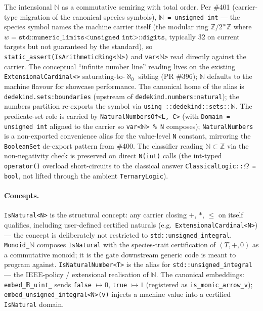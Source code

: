 \documentclass[11pt, a4paper]{report}
\begin{document}
The intensional $\mathbb{N}$ as a commutative semiring with total order. Per \#401 (carrier-type migration of the canonical species symbols), \texttt{$\mathbb{N}$ = unsigned int} --- the species symbol names the machine carrier itself (the modular ring $\mathbb{Z}/2^w\mathbb{Z}$ where $w = \texttt{std::numeric\_limits<unsigned int>::digits}$, typically 32 on current targets but not guaranteed by the standard), so \texttt{static\_assert(IsArithmeticRing<$\mathbb{N}$>)} and \texttt{var<$\mathbb{N}$>} read directly against the carrier. The conceptual ``infinite number line'' reading lives on the existing \texttt{ExtensionalCardinal<>} saturating-to-$\aleph_0$ sibling (PR \#396); $\mathbb{N}$ defaults to the machine flavour for showcase performance. The canonical home of the alias is \texttt{dedekind.sets:boundaries} (upstream of \texttt{dedekind.numbers:natural}); the numbers partition re-exports the symbol via \texttt{using ::dedekind::sets::$\mathbb{N}$}. The predicate-set role is carried by \texttt{NaturalNumbersOf<L, C>} (with \texttt{Domain = unsigned int} aligned to the carrier so \texttt{var<$\mathbb{N}$> \% N} composes); \texttt{NaturalNumbers} is a non-exported convenience alias for the value-level \texttt{N} constant, mirroring the \texttt{BooleanSet} de-export pattern from \#400. The classifier reading $\mathbb{N} \subset \mathbb{Z}$ via the non-negativity check is preserved on direct \texttt{N(int)} calls (the int-typed \texttt{operator()} overload short-circuits to the classical answer \texttt{ClassicalLogic::$\Omega$ = bool}, not lifted through the ambient \texttt{TernaryLogic}).

\paragraph{Concepts.} \texttt{IsNatural<N>} is the structural concept: any carrier closing $+$, $*$, $\leq$ on itself qualifies, including user-defined certified naturals (e.g.\ \texttt{ExtensionalCardinal<N>}) --- the concept is deliberately not restricted to \texttt{std::unsigned\_integral}. \texttt{Monoid\_$\mathbb{N}$} composes \texttt{IsNatural} with the species-trait certification of $(T, +, 0)$ as a commutative monoid; it is the gate downstream generic code is meant to program against. \texttt{IsNaturalNumber<T>} is the alias for \texttt{std::unsigned\_integral} --- the IEEE-policy / extensional realisation of $\mathbb{N}$. The canonical embeddings: \texttt{embed\_$\mathbb{B}$\_uint\_} sends \texttt{false} $\mapsto 0$, \texttt{true} $\mapsto 1$ (registered as \texttt{is\_monic\_arrow\_v}); \texttt{embed\_unsigned\_integral<N>(v)} injects a machine value into a certified \texttt{IsNatural} domain.
\end{document}
